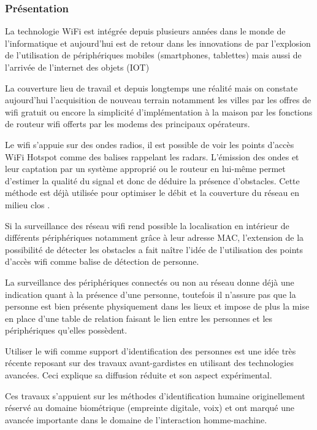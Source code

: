 \documentclass[conference,compsoc]{IEEEtran}
\begin{document}
\subsubsection{Présentation}

La technologie WiFi est intégrée depuis plusieurs années dans le monde de l'informatique et aujourd'hui est de retour dans les innovations de par l'explosion de l'utilisation de périphériques mobiles (smartphones, tablettes) mais aussi de l'arrivée de l'internet des objets (IOT) \cite{wifialliance}

La couverture lieu de travail et depuis longtemps une réalité mais on constate aujourd'hui l'acquisition de nouveau terrain notamment les villes par les offres de wifi gratuit ou encore la simplicité d'implémentation à la maison par les fonctions de routeur wifi offerts par les modems des principaux opérateurs.

Le wifi s'appuie sur des ondes radios, il est possible de voir les points d'accès WiFi Hotspot comme des balises rappelant les radars. L'émission des ondes et leur captation par un système approprié ou le routeur en lui-même permet d'estimer la qualité du signal et donc de déduire la présence d'obstacles. Cette méthode est déjà utilisée pour optimiser le débit et la couverture du réseau en milieu clos \cite{1611.02049v1}.

Si la surveillance des réseau wifi rend possible la localisation en intérieur de différents périphériques notamment grâce à leur adresse MAC, l'extension de la possibilité de détecter les obstacles a fait naître l'idée de l'utilisation des points d'accès wifi comme balise de détection de personne.

La surveillance des périphériques connectés ou non au réseau donne déjà une indication quant à la présence d'une personne, toutefois il n'assure pas que la personne est bien présente physiquement dans les lieux et impose de plus la mise en place d'une table de relation faisant le lien entre les personnes et les périphériques qu'elles possèdent.

Utiliser le wifi comme support d'identification des personnes est une idée très récente reposant sur des travaux avant-gardistes en utilisant des technologies avancées. Ceci explique sa diffusion réduite et son aspect expérimental.

Ces travaux s'appuient sur les méthodes d'identification humaine originellement réservé au domaine biométrique (empreinte digitale, voix) et ont marqué une avancée importante dans le domaine de l'interaction homme-machine. \cite{1608.03430}
\end{document}

